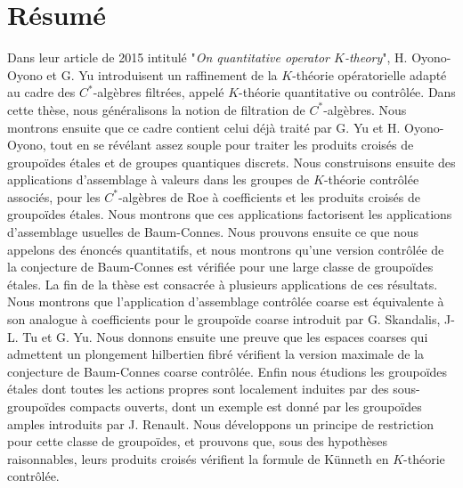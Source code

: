 \section*{Résumé}
Dans leur article de 2015 intitulé "\textit{On quantitative operator $K$-theory}", H. Oyono-Oyono et G. Yu introduisent un raffinement de la $K$-théorie opératorielle adapté au cadre des $C^*$-algèbres filtrées, appelé $K$-théorie quantitative ou contrôlée. Dans cette thèse, nous généralisons la notion de filtration de $C^*$-algèbres. Nous montrons ensuite que ce cadre contient celui déjà traité par G. Yu et H. Oyono-Oyono, tout en se révélant assez souple pour traiter les produits croisés de groupoïdes étales et de groupes quantiques discrets. Nous construisons ensuite des applications d'assemblage à valeurs dans les groupes de $K$-théorie contrôlée associés, pour les $C^*$-algèbres de Roe à coefficients et les produits croisés de groupoïdes étales. Nous montrons que ces applications factorisent les applications d'assemblage usuelles de Baum-Connes. Nous prouvons ensuite ce que nous appelons des énoncés quantitatifs, et nous montrons qu'une version contrôlée de la conjecture de Baum-Connes est vérifiée pour une large classe de groupoïdes étales. La fin de la thèse est consacrée à plusieurs applications de ces résultats. Nous montrons que l'application d'assemblage contrôlée coarse est équivalente à son analogue à coefficients pour le groupoïde coarse introduit par G. Skandalis, J-L. Tu et G. Yu. Nous donnons ensuite une preuve que les espaces coarses qui admettent un plongement hilbertien fibré vérifient la version maximale de la conjecture de Baum-Connes coarse contrôlée. Enfin nous étudions les groupoïdes étales dont toutes les actions propres sont localement induites par des sous-groupoïdes compacts ouverts, dont un exemple est donné par les groupoïdes amples introduits par J. Renault. Nous développons un principe de restriction pour cette classe de groupoïdes, et prouvons que, sous des hypothèses raisonnables, leurs produits croisés vérifient la formule de Künneth en $K$-théorie contrôlée.  

